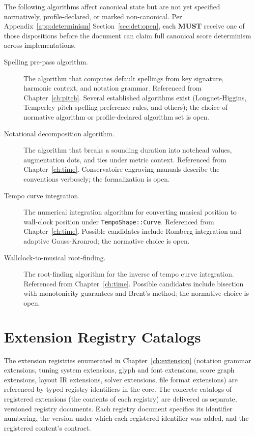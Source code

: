 \documentclass[11pt,letterpaper]{report}
\newcommand{\MUST}{\textbf{MUST}}
\begin{document}
The following algorithms affect canonical state but are not yet
specified normatively, profile-declared, or marked
non-canonical. Per Appendix~\ref{app:determinism}
Section~\ref{sec:det:open}, each \MUST{} receive one of those
dispositions before the document can claim full canonical
score determinism across implementations.

\begin{description}
  \item[Spelling pre-pass algorithm.] The algorithm that
    computes default spellings from key signature, harmonic
    context, and notation grammar. Referenced from
    Chapter~\ref{ch:pitch}. Several established algorithms
    exist (Longuet-Higgins, Temperley pitch-spelling preference
    rules, and others); the choice of normative algorithm or
    profile-declared algorithm set is open.
  \item[Notational decomposition algorithm.] The algorithm that
    breaks a sounding duration into notehead values, augmentation
    dots, and ties under metric context. Referenced from
    Chapter~\ref{ch:time}. Conservatoire engraving manuals
    describe the conventions verbosely; the formalization is
    open.
  \item[Tempo curve integration.] The numerical integration
    algorithm for converting musical position to wall-clock
    position under \texttt{TempoShape::Curve}. Referenced from
    Chapter~\ref{ch:time}. Possible candidates include Romberg
    integration and adaptive Gauss-Kronrod; the normative
    choice is open.
  \item[Wallclock-to-musical root-finding.] The root-finding
    algorithm for the inverse of tempo curve integration.
    Referenced from Chapter~\ref{ch:time}. Possible candidates
    include bisection with monotonicity guarantees and
    Brent's method; the normative choice is open.
\end{description}

\section{Extension Registry Catalogs}
\label{sec:deferred:registries}

The extension registries enumerated in
Chapter~\ref{ch:extension} (notation grammar extensions,
tuning system extensions, glyph and font extensions, score
graph extensions, layout IR extensions, solver extensions,
file format extensions) are referenced by typed registry
identifiers in the core. The concrete catalogs of registered
extensions (the contents of each registry) are delivered as
separate, versioned registry documents. Each registry document
specifies its identifier numbering, the version under which
each registered identifier was added, and the registered
content's contract.
\end{document}
